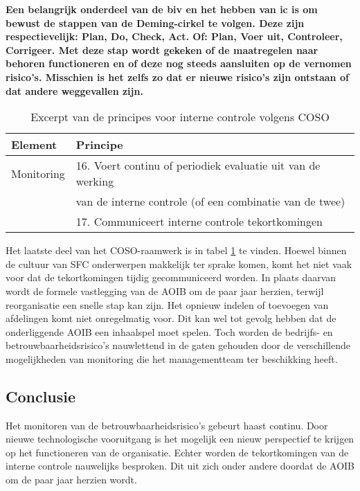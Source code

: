\textbf{Een belangrijk onderdeel van de \gls{biv} en het hebben van \gls{ic} is om bewust de stappen van de Deming-cirkel te volgen. Deze zijn respectievelijk: Plan, Do, Check, Act. Of: Plan, Voer uit, Controleer, Corrigeer. Met deze stap wordt gekeken of de maatregelen naar behoren functioneren en of deze nog steeds aansluiten op de vernomen risico's. Misschien is het zelfs zo dat er nieuwe risico's zijn ontstaan of dat andere weggevallen zijn. \citep{bivpraktijk}}

\begin{table}[!h]
    \centering
    \caption{Excerpt van de principes voor interne controle volgens COSO}
    \begin{tabular}{l l}
        \toprule
        \textbf{Element} & \textbf{Principe} \\
        \midrule
        Monitoring & 16. Voert continu of periodiek evaluatie uit van de werking \\
        & van de interne controle (of een combinatie van de twee) \\
         & 17. Communiceert interne controle tekortkomingen \\
        \bottomrule
    \end{tabular}
    \label{tab:monitoringprincipes}
\end{table}

Het laatste deel van het COSO-raamwerk is in tabel \ref{tab:monitoringprincipes} te vinden. Hoewel binnen de cultuur van SFC onderwerpen makkelijk ter sprake komen, komt het niet vaak voor dat de tekortkomingen tijdig gecommuniceerd worden. In plaats daarvan wordt de formele vastlegging van de AOIB om de paar jaar herzien, terwijl reorganisatie een snelle stap kan zijn. Het opnieuw indelen of toevoegen van afdelingen komt niet onregelmatig voor. Dit kan wel tot gevolg hebben dat de onderliggende AOIB een inhaalspel moet spelen. Toch worden de bedrijfs- en betrouwbaarheidsrisico's nauwlettend in de gaten gehouden door de verschillende mogelijkheden van monitoring die het managementteam ter beschikking heeft. \citep{aoibsfc}

\subsection*{Conclusie}
Het monitoren van de betrouwbaarheidsrisico's gebeurt haast continu. Door nieuwe technologische vooruitgang is het mogelijk een nieuw perspectief te krijgen op het functioneren van de organisatie. Echter worden de tekortkomingen van de interne controle nauwelijks besproken. Dit uit zich onder andere doordat de AOIB om de paar jaar herzien wordt.